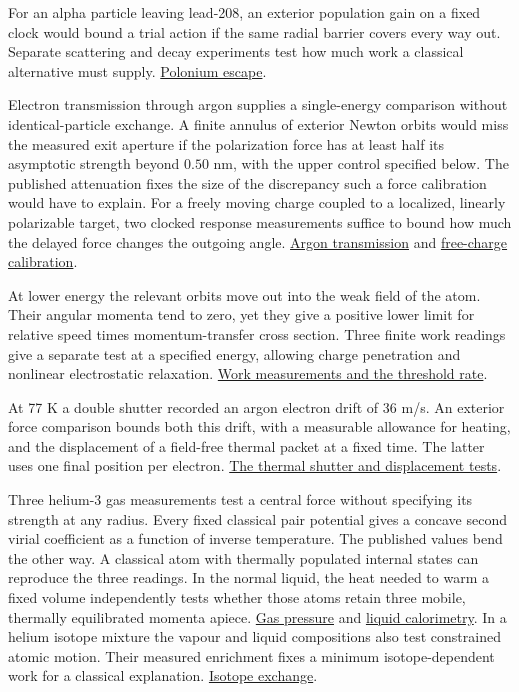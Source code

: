 \documentclass[11pt,a4paper]{article}
\begin{document}
For an alpha particle leaving lead-208, an exterior population gain on a
fixed clock would bound a trial action if the same radial barrier covers
every way out. Separate scattering and decay experiments test how much
work a classical alternative must supply.
\hyperref[a-clock-on-escape-through-a-central-force-barrier]{Polonium
escape}.

Electron transmission through argon supplies a single-energy comparison
without identical-particle exchange. A finite annulus of exterior Newton
orbits would miss the measured exit aperture if the polarization force
has at least half its asymptotic strength beyond \(0.50\) nm, with the
upper control specified below. The published attenuation fixes the size
of the discrepancy such a force calibration would have to explain. For a
freely moving charge coupled to a localized, linearly polarizable
target, two clocked response measurements suffice to bound how much the
delayed force changes the outgoing angle.
\hyperref[an-exterior-force-test-with-argon]{Argon transmission} and
\hyperref[two-pulse-tests-for-a-freely-moving-charge]{free-charge
calibration}.

At lower energy the relevant orbits move out into the weak field of the
atom. Their angular momenta tend to zero, yet they give a positive lower
limit for relative speed times momentum-transfer cross section. Three
finite work readings give a separate test at a specified energy,
allowing charge penetration and nonlinear electrostatic relaxation.
\hyperref[three-work-readings-and-the-low-energy-limit]{Work
measurements and the threshold rate}.

At 77 K a double shutter recorded an argon electron drift of 36 m/s. An
exterior force comparison bounds both this drift, with a measurable
allowance for heating, and the displacement of a field-free thermal
packet at a fixed time. The latter uses one final position per electron.
\hyperref[a-thermal-test-with-two-shutters]{The thermal shutter and
displacement tests}.

Three helium-3 gas measurements test a central force without specifying
its strength at any radius. Every fixed classical pair potential gives a
concave second virial coefficient as a function of inverse temperature.
The published values bend the other way. A classical atom with thermally
populated internal states can reproduce the three readings. In the
normal liquid, the heat needed to warm a fixed volume independently
tests whether those atoms retain three mobile, thermally equilibrated
momenta apiece. \hyperref[helium-pressure-at-three-temperatures]{Gas
pressure} and
\hyperref[how-many-atomic-motions-can-the-measured-heat-support]{liquid
calorimetry}. In a helium isotope mixture the vapour and liquid
compositions also test constrained atomic motion. Their measured
enrichment fixes a minimum isotope-dependent work for a classical
explanation.
\hyperref[isotope-exchange-as-a-test-of-central-forces]{Isotope
exchange}.
\end{document}

